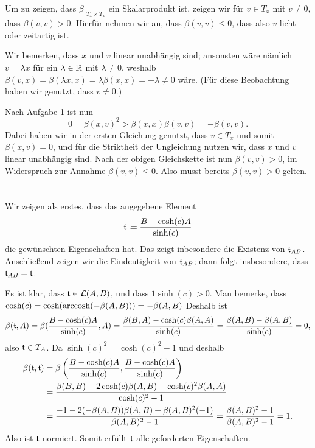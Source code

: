 \documentclass[a4paper,10pt,numbers=noenddot]{scrartcl}
\begin{document}
Um zu zeigen, dass $\beta|_{T_x \times T_x}$ ein Skalarprodukt ist, zeigen wir für $v \in T_x$ mit $v \neq 0$, dass $\beta(v,v) > 0$.
Hierfür nehmen wir an, dass $\beta(v, v) \leq 0$, dass also $v$ licht- oder zeitartig ist.

Wir bemerken, dass $x$ und $v$ linear unabhängig sind; ansonsten wäre nämlich $v = \lambda x$ für ein $\lambda \in \mathbb{R}$ mit $\lambda \neq 0$, weshalb $\beta(v,x) = \beta(\lambda x, x) = \lambda \beta(x,x) = - \lambda \neq 0$ wäre.
(Für diese Beobachtung haben wir genutzt, dass $v \neq 0$.)

Nach Aufgabe 1 ist nun
\[
     0
  = \beta(x,v)^2
  > \beta(x,x) \beta(v,v)
  = -\beta(v,v).
\]
Dabei haben wir in der ersten Gleichung genutzt, dass $v \in T_x$ und somit $\beta(x,v) = 0$, und für die Striktheit der Ungleichung nutzen wir, dass $x$ und $v$ linear unabhängig sind.
Nach der obigen Gleichskette ist nun $\beta(v,v) > 0$, im Widerspruch zur Annahme $\beta(v,v) \leq 0$.
Also musst bereits $\beta(v,v) > 0$ gelten.










\section{}

Wir zeigen als erstes, dass das angegebene Element
\[
  \mathfrak{t}
  \coloneqq
  \frac{B - \cosh(c) A}{\sinh(c)}
\]
die gewünschten Eigenschaften hat.
Das zeigt inbesondere die Existenz von $\mathfrak{t}_{AB}$.
Anschließend zeigen wir die Eindeutigkeit von $\mathfrak{t}_{AB}$; dann folgt insbesondere, dass $\mathfrak{t}_{AB} = \mathfrak{t}$.

Es ist klar, dass $\mathfrak{t} \in \operatorname{\mathcal{L}}(A,B)$, und dass $1\sinh(c) > 0$.
Man bemerke, dass $\cosh(c) = \cosh(\operatorname{arccosh}(-\beta(A,B))) = -\beta(A,B)$
Deshalb ist
\[
    \beta(\mathfrak{t}, A)
  = \beta(\frac{B - \cosh(c) A}{\sinh(c)}, A)
  = \frac{\beta(B, A) - \cosh(c) \beta(A,A)}{\sinh(c)}
  = \frac{\beta(A,B) - \beta(A,B)}{\sinh(c)}
  = 0,
\]
also $\mathfrak{t} \in T_A$.
Da $\sinh(c)^2 = \cosh(c)^2 - 1$ und deshalb
\begin{align*}
      \beta(\mathfrak{t}, \mathfrak{t})
  &=  \beta\left( \frac{B - \cosh(c) A}{\sinh(c)}, \frac{B - \cosh(c) A}{\sinh(c)} \right)    \\
  &=  \frac{ \beta(B, B) - 2 \cosh(c) \beta(A,B) + \cosh(c)^2 \beta(A,A) }{ \cosh(c)^2 - 1 }  \\
  &=  \frac{ -1 - 2 (- \beta(A, B)) \beta(A,B) + \beta(A,B)^2 (-1) }{ \beta(A,B)^2 - 1 }
   =  \frac{ \beta(A, B)^2 - 1 }{ \beta(A, B)^2 - 1 }
   =  1.
\end{align*}
Also ist $\mathfrak{t}$ normiert.
Somit erfüllt $\mathfrak{t}$ alle geforderten Eigenschaften.
\end{document}
